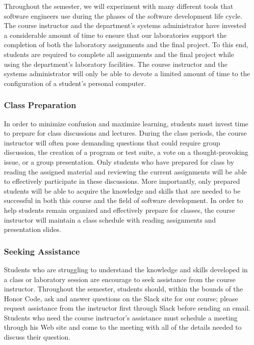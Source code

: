 \documentclass[11pt]{article}
\begin{document}
Throughout the semester, we will experiment with many different tools that software engineers use during the phases of
the software development life cycle. The course instructor and the department's systems administrator have invested a
considerable amount of time to ensure that our laboratories support the completion of both the laboratory assignments
and the final project. To this end, students are required to complete all assignments and the final project while using
the department's laboratory facilities. The course instructor and the systems administrator will only be able to devote
a limited amount of time to the configuration of a student's personal computer.

\subsubsection*{Class Preparation}

In order to minimize confusion and maximize learning, students must invest time to prepare for class discussions and
lectures. During the class periods, the course instructor will often pose demanding questions that could require group
discussion, the creation of a program or test suite, a vote on a thought-provoking issue, or a group presentation.
Only students who have prepared for class by reading the assigned material and reviewing the current assignments will be
able to effectively participate in these discussions. More importantly, only prepared students will be able to acquire
the knowledge and skills that are needed to be successful in both this course and the field of software development. In
order to help students remain organized and effectively prepare for classes, the course instructor will maintain a class
schedule with reading assignments and presentation slides.


\subsubsection*{Seeking Assistance}

Students who are struggling to understand the knowledge and skills developed in a class or laboratory session are
encourage to seek assistance from the course instructor. Throughout the semester, students should, within the bounds of
the Honor Code, ask and answer questions on the Slack site for our course; please request assistance from the instructor
first through Slack before sending an email. Students who need the course instructor's assistance must schedule a
meeting through his Web site and come to the meeting with all of the details needed to discuss their question.
\end{document}
